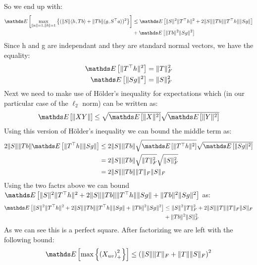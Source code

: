 So we end up with:
\begin{align*}
    \pexp{\underset{\norm{a}=1, \norm{b}=1}{\max}\left\{(\norm{S}\dotprod{h, Tb} + \norm{Tb}\dotprod{g, S^{\top}a})^2\right\}} &\leq \pexp{\norm{S}^2\norm{T^{\top}h}^2 + 2\norm{S}\norm{Tb}\norm{T^{\top}h}\norm{Sg}} \\
                                                                                                                               &+ \pexp{\norm{Tb}^2\norm{Sg}^2}
\end{align*}
Since h and g are independant and they are standard normal vectors, we have the equality:
\begin{align*}
    \pexp{\norm{T^{\top}h}^2} &= \norm{T}_F^2 \\
    \pexp{\norm{Sg}^2} &= \norm{S}_F^2
\end{align*}
Next we need to make use of Hölder's inequality for expectations which (in our particular case of the $\ell_2$ norm) can be written as:
\begin{align*}
    \pexp{\norm{XY}} \leq \sqrt{\pexp{\norm{X}^2}}\sqrt{\pexp{\norm{Y}^2}}
\end{align*} 
Using this version of Hölder's inequality we can bound the middle term as:
\begin{align*}
    2\norm{S}\norm{Tb}\pexp{\norm{T^{\top}h}\norm{Sg}} &\leq 2\norm{S}\norm{Tb}\sqrt{\pexp{\norm{T^{\top}h}^2}}\sqrt{\pexp{\norm{Sg}^2}} \\
                                                       &= 2\norm{S}\norm{Tb}\sqrt{\norm{T}_F^2}\sqrt{\norm{S}_F^2} \\
                                                       &= 2\norm{S}\norm{Tb}\norm{T}_F\norm{S}_F
\end{align*}
Using the two factrs above we can bound $\pexp{\norm{S}^2\norm{T^{\top}h}^2 + 2\norm{S}\norm{Tb}\norm{T^{\top}h}\norm{Sg} + \norm{Tb}^2\norm{Sg}^2}$ as:
\begin{align*}
    \pexp{\norm{S}^2\norm{T^{\top}h}^2 + 2\norm{S}\norm{Tb}\norm{T^{\top}h}\norm{Sg} + \norm{Tb}^2\norm{Sg}^2} &\leq \norm{S}^2\norm{T}_F^2 + 2\norm{S}\norm{T}\norm{T}_F\norm{S}_F  \\
                                                                                                               &+ \norm{Tb}^2\norm{S}_F^2
\end{align*}
As we can see this is a perfect square. After factorizing we are left with the following bound:
\begin{align*}
    \pexp{\max\left\{ {(X_{uv})}_{+}^2\right\}} \leq \left( \norm{S}\norm{T}_F +\norm{T}\norm{S}_F\right)^2
\end{align*}
